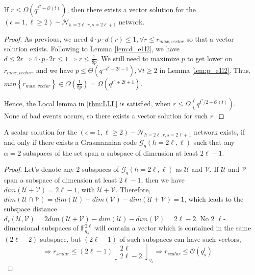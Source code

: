 \begin{thm}
If $r\leq\Omega\left(q^{t^{2}+\mathcal{O}\left(t\right)}\right)$,
then there exists a vector solution for the $\left(\epsilon=1,\ell\geq2\right)-\mathcal{N}_{h=2\ell,r,s=2\ell+1}$
network. \label{theo:r_for_e1l2}
\end{thm}
\begin{proof}
As previous, we need $4\cdot p\cdot d(r)\leq1,\forall r\leq r_{max,vector}$
so that a vector solution exists. Following to Lemma \ref{lem:d_e1l2},
we have $d\leq2r\Rightarrow4\cdot p\cdot2r\leq1\Rightarrow r\leq\frac{1}{8p}$.
We still need to maximize $p$ to get lower on $r_{max,vector}$,
and we have $p\leq\Theta\left(q^{-t^{2}-2t-1}\right),\forall t\geq2$
in Lemma \ref{lem:p_e1l2}. Thus, $min\left\{ r_{max,vector}\right\} \in\Omega\left(\frac{1}{8p}\right)=\Omega\left(q^{t^{2}+2t+1}\right)$.

Hence, the Local lemma in \ref{thm:LLL} is satisfied, when $r\leq\Omega\left(q^{t^{2}/2+\mathcal{O}\left(t\right)}\right)$.
None of bad events occurs, so there exists a vector solution for such
$r$.
\end{proof}
\begin{lem}
A scalar solution for the $\left(\epsilon=1,\ell\geq2\right)-\mathcal{N}_{h=2\ell,r,s=2\ell+1}$
network exists, if and only if there exists a Grasmannian code $\mathcal{G}_{q}\left(h=2\ell,\ell\right)$
such that any $\alpha=2$ subspaces of the set span a subspace of
dimension at least $2\ell-1$. 
\end{lem}
\begin{proof}
Let's denote any 2 subspaces of $\mathcal{G}_{q}\left(h=2\ell,\ell\right)$
as $\mathcal{U}$ and $\mathcal{V}$. If $\mathcal{U}$ and $\mathcal{V}$
span a subspace of dimension at least $2\ell-1$, then we have $dim\left(\mathcal{U}+\mathcal{V}\right)=2\ell-1$,
with $\mathcal{U}+\mathcal{V}$. Therefore, $dim\left(\mathcal{U}\cap\mathcal{V}\right)=dim\left(\mathcal{U}\right)+dim\left(\mathcal{V}\right)-dim\left(\mathcal{U}+\mathcal{V}\right)=1$,
which leads to the subspace distance $d_{s}(\mathcal{U},\mathcal{V})=2dim\left(\mathcal{U}+\mathcal{V}\right)-dim\left(\mathcal{U}\right)-dim\left(\mathcal{V}\right)=2\ell-2$.
No 2 $\ell$-dimensional subspaces of $\ensuremath{\mathbb{F}}_{q_{s}}^{2\ell}$
will contain a vector which is contained in the same $\left(2\ell-2\right)$-subspace,
but $\left(2\ell-1\right)$ of such subspaces can have such vectors,
\[
\Rightarrow r_{scalar}\leq\left(2\ell-1\right)\left[\begin{array}{c}
2\ell\\
2\ell-2
\end{array}\right]_{q_{s}}\Rightarrow r_{scalar}\leq\mathcal{O}\left(q_{s}^{l}\right)
\]
\end{proof}
